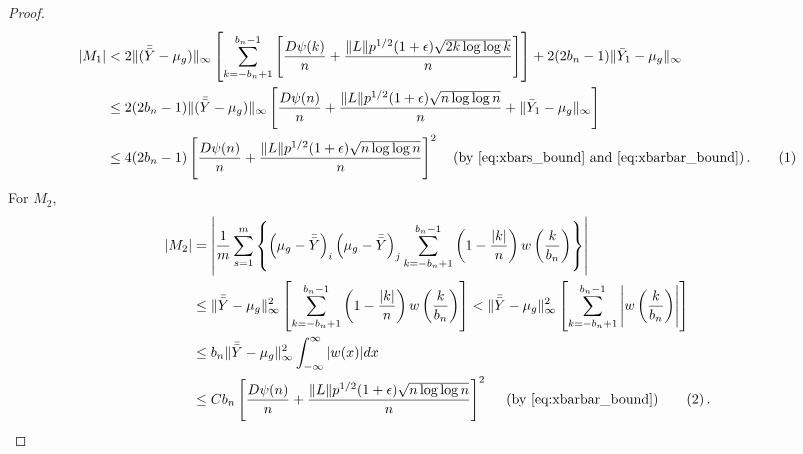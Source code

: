 \documentclass[11pt]{article}
\newcommand\numberthis{\addtocounter{equation}{1}\tag{\theequation}}
\theoremstyle{remark}
\begin{document}
\begin{proof}
\begin{align*}
|M_1|
    & < 2\|(\bar{\bar{Y}} - \mu_g)\|_{\infty} \left[\sum\limits_{k=-b_n + 1}^{b_n-1}\left[ \dfrac{D \psi(k)}{n} + \dfrac{\|L\| p^{1/2}(1+\epsilon)\sqrt{2k \log\log k}}{n}  \right] \right]  + 2(2b_n - 1) \|\bar{Y}_1 - \mu_g\|_{\infty} \\
    &\leq 2(2b_n - 1)\|(\bar{\bar{Y}} - \mu_g)\|_{\infty} \left[ \dfrac{D \psi(n)}{n} + \dfrac{\|L\| p^{1/2}(1+\epsilon)\sqrt{n \log\log n}}{n} + \|\bar{Y}_1 - \mu_g\|_{\infty}  \right]\\
    & \leq 4(2b_n - 1)\left[ \dfrac{D \psi(n)}{n} + \dfrac{\|L\| p^{1/2}(1+\epsilon)\sqrt{n \log\log n}}{n}  \right]^2  \quad \text{(by \eqref{eq:xbars_bound} and \eqref{eq:xbarbar_bound})}\,. \numberthis \label{eq:strong_consis_term-1}
\end{align*}
%
%
For $M_2$,
\begin{align*}
   |M_2| & = \left|\dfrac{1}{m}\sum\limits_{s=1}^{m}\left\{ \left(\mu_g - \bar{\bar{Y}} \right)_i  \left(\mu_g - \bar{\bar{Y}} \right)_j\sum_{k=-b_n+1}^{b_n-1}\left(1-\dfrac{|k|}{n}\right)w\left(\dfrac{k}{b_n}\right)\right\}\right|\\
    & \leq\|\bar{\bar{Y}} - \mu_g\|_{\infty}^2\left[\sum_{k=-b_n+1}^{b_n-1}\left(1-\dfrac{|k|}{n}\right)w\left(\dfrac{k}{b_n}\right)\right] < \|\bar{\bar{Y}} - \mu_g\|_{\infty}^2\left[\sum_{k=-b_n+1}^{b_n-1}\left|w\left(\dfrac{k}{b_n}\right)\right|\right]\\
    & \leq b_n\|\bar{\bar{Y}} - \mu_g\|_{\infty}^2 \int_{-\infty}^{\infty}|w(x)|dx \\
    & \leq Cb_n\left[ \dfrac{D \psi(n)}{n} + \dfrac{\|L\| p^{1/2}(1+\epsilon)\sqrt{n \log\log n}}{n}  \right]^2 \quad \text{ (by \eqref{eq:xbarbar_bound})} \numberthis \label{eq:strong_consis_term-2} \,.

\end{align*}
\end{proof}
\end{document}
